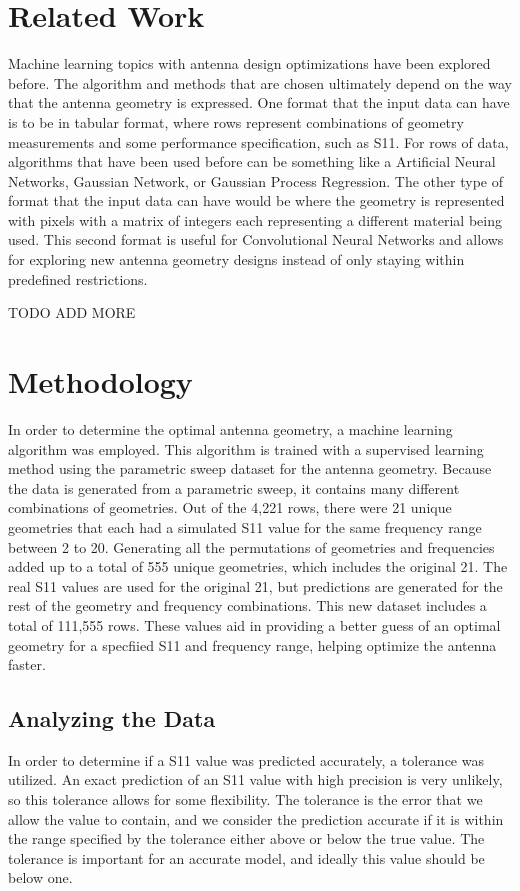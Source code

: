 \documentclass[lettersize,journal]{IEEEtran}
\begin{document}
\section{Related Work}
Machine learning topics with antenna design optimizations have been explored before. The algorithm and methods that are chosen ultimately depend on the way that the antenna geometry is expressed. One format that the input data can have is to be in tabular format, where rows represent combinations of geometry measurements and some performance specification, such as S11. For rows of data, algorithms that have been used before can be something like a Artificial Neural Networks, Gaussian Network, or Gaussian Process Regression. The other type of format that the input data can have would be where the geometry is represented with pixels with a matrix of integers each representing a different material being used. This second format is useful for Convolutional Neural Networks and allows for exploring new antenna geometry designs instead of only staying within predefined restrictions.~\cite{wu_machine_2023} 

TODO ADD MORE 


\section{Methodology}
In order to determine the optimal antenna geometry, a machine learning algorithm was employed. This algorithm is trained with a supervised learning method using the parametric sweep dataset for the antenna geometry. Because the data is generated from a parametric sweep, it contains many different combinations of geometries. Out of the 4,221 rows, there were 21 unique geometries that each had a simulated S11 value for the same frequency range between 2 to 20. Generating all the permutations of geometries and frequencies added up to a total of 555 unique geometries, which includes the original 21. The real S11 values are used for the original 21, but predictions are generated for the rest of the geometry and frequency combinations. This new dataset includes a total of 111,555 rows. These values aid in providing a better guess of an optimal geometry for a specfiied S11 and frequency range, helping optimize the antenna faster. 

\subsection{Analyzing the Data}
In order to determine if a S11 value was predicted accurately, a tolerance was utilized. An exact prediction of an S11 value with high precision is very unlikely, so this tolerance allows for some flexibility. The tolerance is the error that we allow the value to contain, and we consider the prediction accurate if it is within the range specified by the tolerance either above or below the true value. The tolerance is important for an accurate model, and ideally this value should be below one.
\end{document}
